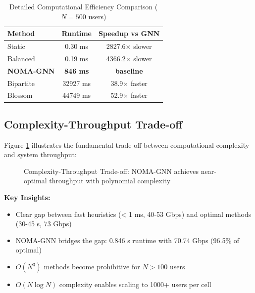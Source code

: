 \begin{table}[H]
\centering
\begin{tabular}{lcc}
\toprule
\textbf{Method} & \textbf{Runtime} & \textbf{Speedup vs GNN} \\
\midrule
Static & 0.30 ms & 2827.6× slower \\
Balanced & 0.19 ms & 4366.2× slower \\
\midrule
\textbf{NOMA-GNN} & \textbf{846 ms} & \textbf{baseline} \\
\midrule
Bipartite & 32927 ms & 38.9× faster \\
Blossom & 44749 ms & 52.9× faster \\
\bottomrule
\end{tabular}
\caption{Detailed Computational Efficiency Comparison ($N=500$ users)}
\label{tab:timing_detailed}
\end{table}

\subsection{Complexity-Throughput Trade-off}

Figure \ref{fig:tradeoff} illustrates the fundamental trade-off between computational complexity and system throughput:

\begin{figure}[H]
\centering
{}
\caption{Complexity-Throughput Trade-off: NOMA-GNN achieves near-optimal throughput with polynomial complexity}
\label{fig:tradeoff}
\end{figure}

\textbf{Key Insights:}
\begin{itemize}
    \item Clear gap between fast heuristics (< 1 ms, 40-53 Gbps) and optimal methods (30-45 s, 73 Gbps)
    \item NOMA-GNN bridges the gap: 0.846 s runtime with 70.74 Gbps (96.5\% of optimal)
    \item $O(N^3)$ methods become prohibitive for $N > 100$ users
    \item $O(N \log N)$ complexity enables scaling to 1000+ users per cell
\end{itemize}

